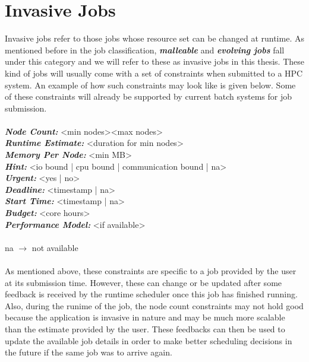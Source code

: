 \section{Invasive Jobs}
Invasive jobs refer to those jobs whose resource set can be changed at runtime. As mentioned before in the job classification, \textbf{\textit{malleable}} and \textbf{\textit{evolving jobs}} fall under this category and we will refer to these as invasive jobs in this thesis. These kind of jobs will usually come with a set of constraints when submitted to a HPC system. An example of how such constraints may look like is given below. Some of these constraints will already be supported by current batch systems for job submission.\\ \\
\textbf{\textit{Node Count:}} <min nodes><max nodes>\\
\textbf{\textit{Runtime Estimate:}} <duration for min nodes>\\
\textbf{\textit{Memory Per Node:}} <min MB>\\
\textbf{\textit{Hint:}} <io bound | cpu bound | communication bound | na>\\
\textbf{\textit{Urgent:}} <yes | no> \\
\textbf{\textit{Deadline:}} <timestamp | na>\\
\textbf{\textit{Start Time:}} <timestamp | na>\\
\textbf{\textit{Budget:}} <core hours>\\
\textbf{\textit{Performance Model:}} <if available>\\ \\
na $\rightarrow$ not available\\ \\
As mentioned above, these constraints are specific to a job provided by the user at its submission time. However, these can change or be updated after some feedback is received by the runtime scheduler once this job has finished running. Also, during the runime of the job, the node count constraints may not hold good because the application is invasive in nature and may be much more scalable than the estimate provided by the user. These feedbacks can then be used to update the available job details in order to make better scheduling decisions in the future if the same job was to arrive again.
